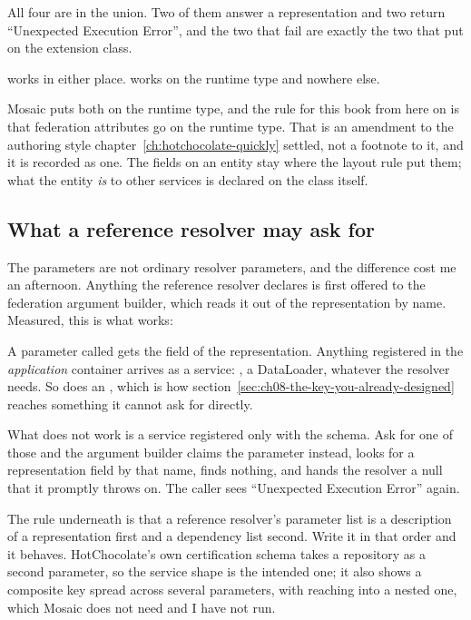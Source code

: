 All four are in the  union. Two of them answer a representation
and two return \enquote{Unexpected Execution Error}, and the two that fail are
exactly the two that put \code{[ReferenceResolver]} on the extension class.

%
\code{[Key]} works in either place. \code{[ReferenceResolver]} works on the
runtime type and nowhere else.

Mosaic puts both on the runtime type, and the rule for this book from here on is
that federation attributes go on the runtime type. That is an amendment to the
authoring style chapter~\ref{ch:hotchocolate-quickly} settled, not a footnote to
it, and it is recorded as one. The fields on an entity stay where the layout
rule put them; what the entity \emph{is} to other services is declared on the
class itself.

\subsection*{What a reference resolver may ask for}

%
The parameters are not ordinary resolver parameters, and the difference cost me
an afternoon. Anything the reference resolver declares is first offered to the
federation argument builder, which reads it out of the representation by name.
Measured, this is what works:

A parameter called  gets the  field of the representation.
Anything registered in the \emph{application} container arrives as a service:
, a DataLoader, whatever the resolver needs. So does an
, which is how
section~\ref{sec:ch08-the-key-you-already-designed} reaches something it cannot
ask for directly.

What does not work is a service registered only with the schema. Ask for one of
those and the argument builder claims the parameter instead, looks for a
representation field by that name, finds nothing, and hands the resolver a null
that it promptly throws on. The caller sees \enquote{Unexpected Execution
Error} again.

The rule underneath is that a reference resolver's parameter list is a
description of a representation first and a dependency list second. Write it in
that order and it behaves. HotChocolate's own certification schema takes a
repository as a second parameter, so the service shape is the intended one; it
also shows a composite key spread across several parameters, with
\code{[Map]} reaching into a nested one, which Mosaic does not need and I have
not run.

%
